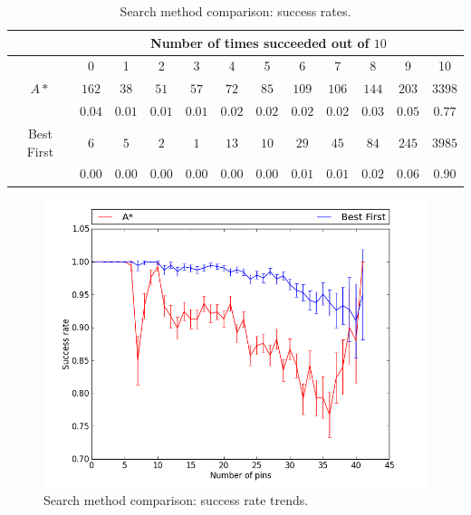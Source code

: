 \begin{table}[H]
\begin{center}
\begin{singlespace}
\begin{tabular}{|c||c|c|c|c|c|c|c|c|c|c|c|}
\hline
 & \multicolumn{11}{|c|}{Number of times succeeded out of $10$} \\
\hline
 & 0 & 1 & 2 & 3 & 4 & 5 & 6 & 7 & 8 & 9 & 10 \\
\hline\hline
$A*$ & $162$ & $38$ & $51$ & $57$ & $72$ & $85$ & $109$ & $106$ & $144$ & $203$ & $3398$ \\
 & $0.04$ & $0.01$ & $0.01$ & $0.01$ & $0.02$ & $0.02$ & $0.02$ & $0.02$ & $0.03$ & $0.05$ & $0.77$ \\
\hline
 Best First & $6$ & $5$ & $2$ & $1$ & $13$ & $10$ & $29$ & $45$ & $84$ & $245$ & $3985$ \\
  & $0.00$ & $0.00$ & $0.00$ & $0.00$ & $0.00$ & $0.00$ & $0.01$ & $0.01$ & $0.02$ & $0.06$ & $0.90$ \\
\hline
\end{tabular}
\end{singlespace}
\end{center}
\label{tb:search_success}
\caption{Search method comparison: success rates.}
\end{table}

\begin{figure}[H]
\begin{center}
\includegraphics[width=\textwidth]{Images/search_success_trend_comparison.png}
\caption{Search method comparison: success rate trends.}
\label{fig:search_success_trend}
\end{center}
\end{figure}

